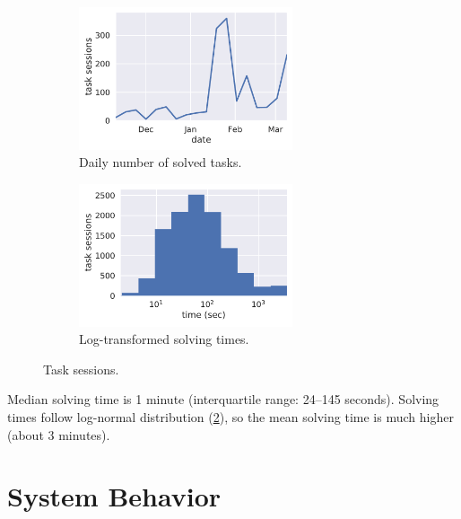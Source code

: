 \begin{figure}[htb]
\centering
\begin{subfigure}{.49\textwidth}
\centering
\includegraphics[height=42mm]{img/daily-task-sessions}
\caption{Daily number of solved tasks.} %
\label{fig:solved-count}
\end{subfigure}
\begin{subfigure}{.49\textwidth}
\centering
\includegraphics[height=42mm]{img/task-sessions-time-log}
\caption{Log-transformed solving times.}
\label{fig:solving-times-all}
\end{subfigure}
\caption{Task sessions.}
\label{fig:daily-task-sessions}
\end{figure}

Median solving time is 1 minute (interquartile range: 24--145 seconds).
Solving times follow log-normal distribution (\cref{fig:solving-times-all}),
so the mean solving time is much higher
(about 3 minutes). %


\section{System Behavior}

